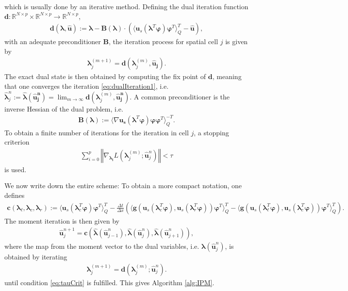 which is usually done by an iterative method. Defining the dual iteration function $\bm{d}:\mathbb{R}^{N\times p}\times\mathbb{R}^{N\times p}\to\mathbb{R}^{N\times p}$,
\begin{align}\label{eq:dualIterationFunction}
\bm{d}(\bm{\lambda},\bm{\hat{u}}):= \bm{\lambda}-\bm{B}(\bm{\lambda})\cdot \left(\langle \bm u_{s}(\bm{\lambda}^T\bm{\varphi})\bm{\varphi}^T\rangle_Q^T-\bm{\hat{u}}\right),
\end{align}
with an adequate preconditioner $\bm{B}$, the iteration process for spatial cell $j$ is given by
\begin{align}\label{eq:dualIteration1}
\bm{\lambda}^{(m+1)}_j = \bm{d}(\bm{\lambda}_j^{(m)},\bm{\hat{u}_j}).
\end{align}
The exact dual state is then obtained by computing the fix point of $\bm{d}$, meaning that one converges the iteration \eqref{eq:dualIteration1}, i.e. $\bm{\hat\lambda}_j^n:=\bm{\hat\lambda}(\bm{\hat u_j^n})=\lim_{m\rightarrow\infty}\bm{d}(\bm{\lambda}_j^{(m)},\bm{\hat{u}_j^n})$. A common preconditioner is the inverse Hessian of the dual problem, i.e.
\begin{align*}
\bm{B}(\bm{\lambda}) := \langle \nabla \bm{u}_{\bm{s}} (\bm{\lambda}^T\bm{\varphi})\bm{\varphi}\bm{\varphi}^T\rangle_Q^{-T}.
\end{align*}
To obtain a finite number of iterations for the iteration in cell $j$, a stopping criterion 
\begin{align}\label{eq:tauCrit}
\sum_{i=0}^p\left\Vert \nabla_{\bm{\lambda_i}}L(\bm{\lambda}_j^{(m)};\bm{\hat{u}}_j^n) \right\Vert < \tau
\end{align}
is used.

We now write down the entire scheme: To obtain a more compact notation, one defines
\begin{align}\label{eq:momentIterationFunction}
\bm{c}\left(\bm{\lambda}_{\ell},\bm{\lambda}_c,\bm{\lambda}_r\right):= \langle \bm u_{s}(\bm{\lambda}_c^T\bm{\varphi})\bm{\varphi}^T\rangle_Q^T - \frac{\Delta t}{\Delta x}\left(\langle \bm g(\bm u_{s}(\bm{\lambda}_c^T\bm{\varphi}),\bm u_{s}(\bm{\lambda}_r^T\bm{\varphi}))\bm{\varphi}^T\rangle_Q^T-\langle \bm g(\bm u_{s}(\bm{\lambda}_{\ell}^T\bm{\varphi}),\bm u_{s}(\bm{\lambda}_c^T\bm{\varphi}))\bm{\varphi}^T\rangle_Q^T\right).
\end{align}
The moment iteration is then given by
\begin{align}\label{eq:momentIteration}
\bm{\hat u}_j^{n+1} = \bm{c}\left(\bm{\hat\lambda}(\bm{\hat u}_{j-1}^n),\bm{\hat\lambda}(\bm{\hat u}_{j}^n),\bm{\hat\lambda}(\bm{\hat u}_{j+1}^n)\right),
\end{align}
where the map from the moment vector to the dual variables, i.e. $\bm{\lambda}(\bm{\hat u}_{j}^n)$, is obtained by iterating
\begin{align}\label{eq:dualIteration}
\bm{\lambda}_j^{(m+1)} = \bm{d}(\bm{\lambda}_{j}^{(m)};\bm{\hat u}_j^{n}).
\end{align}
until condition \eqref{eq:tauCrit} is fulfilled. This gives Algorithm \ref{alg:IPM}.

